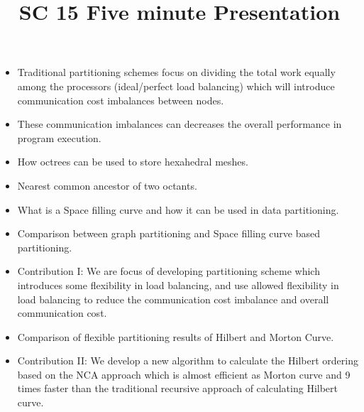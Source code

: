 \documentclass[a4paper,10pt]{article}
\title{SC 15 Five minute Presentation}
\author{}
\date{}
\begin{document}
\maketitle

\begin{itemize}

\item Traditional partitioning schemes focus on dividing the total work equally among the processors (ideal/perfect load balancing) which will introduce communication cost imbalances between nodes.
\item These communication imbalances can decreases the overall performance in program execution. 
\item How octrees can be used to store hexahedral meshes.
\item Nearest common ancestor of two octants.
\item What is a Space filling curve and how it can be used in data partitioning.
\item Comparison between graph partitioning and Space filling curve based partitioning.
\item Contribution I: We are focus of developing partitioning scheme which introduces some flexibility in load balancing, and use allowed flexibility in load balancing to reduce the communication cost imbalance and overall
communication cost.
\item Comparison of flexible partitioning results of Hilbert and Morton Curve. 
\item Contribution II: We develop a new algorithm to calculate the Hilbert ordering based on the NCA approach which is almost efficient as Morton curve and 9 times faster than the traditional recursive approach of calculating
Hilbert curve.
\end{itemize}
\end{document}
